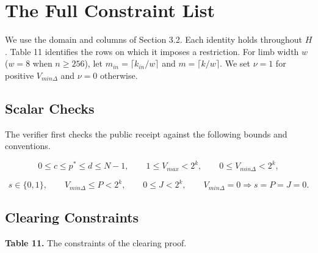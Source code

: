 
\section{The Full Constraint List}

We use the domain and columns of Section 3.2. Each identity holds throughout \(H\). Table 11 identifies the rows on which it imposes a restriction. For limb width \(w\) (\(w=8\) when \(n\ge256\)), let \(m_{in}=\lceil k_{in}/w\rceil\) and \(m=\lceil k/w\rceil\). We set \(\nu=1\) for positive \(V_{min\Delta}\) and \(\nu=0\) otherwise.

\subsection{Scalar Checks}

The verifier first checks the public receipt against the following bounds and conventions.

\[0 \le c \le p^* \le d \le N-1, \qquad 1 \le V_{max} < 2^k, \qquad 0 \le V_{min\Delta} < 2^k,\]

\[s \in \{0,1\}, \qquad V_{min\Delta} \le P < 2^k, \qquad 0 \le J < 2^k, \qquad V_{min\Delta} = 0 \Rightarrow s = P = J = 0.\]

\subsection{Clearing Constraints}

\textbf{Table 11.} The constraints of the clearing proof.

